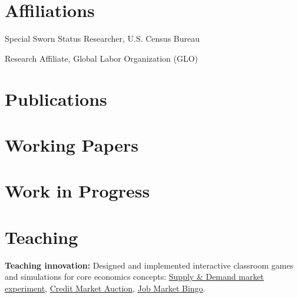\documentclass[12pt,letterpaper]{report}
\begin{document}
\section*{Affiliations}
\begin{tablist}
\item[2025--] \tab{}Special Sworn Status Researcher, U.S. Census Bureau
\item[2025--] \tab{}Research Affiliate, Global Labor Organization (GLO)
\end{tablist}
    
\section*{Publications}
\begin{tablist}
\item {}
\item {}
\item {}
\end{tablist}
\section*{Working Papers}
\begin{tablist}
\item {}
\item {}
\item {}	
\item {}
\item {}	
\end{tablist}
\section*{Work in Progress}
\begin{tablist}
\item {}
\item {}
\item {}
\item {}

\end{tablist}

\section*{Teaching}
\noindent \textbf{Teaching innovation:} Designed and implemented interactive classroom games and simulations for core economics concepts:
\href{https://kerrlyu.github.io/teaching/econ\_103/supply\_and\_demand/}{Supply \& Demand market experiment},
\href{https://kerrlyu.github.io/teaching/econ\_103/credit\_market\_auction/}{Credit Market Auction},
\href{https://kerrlyu.github.io/teaching/econ\_103/job\_market\_bingo/}{Job Market Bingo}.
\end{document}

